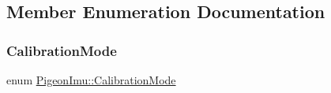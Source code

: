 \subsection{Member Enumeration Documentation}
\mbox{\label{class_pigeon_imu_a1d73ea84ad5c812e809698fab0b9b490}} 
\subsubsection{\texorpdfstring{Calibration\+Mode}{CalibrationMode}}
{\footnotesize\ttfamily enum \hyperlink{class_pigeon_imu_a1d73ea84ad5c812e809698fab0b9b490}{Pigeon\+Imu\+::\+Calibration\+Mode}}


